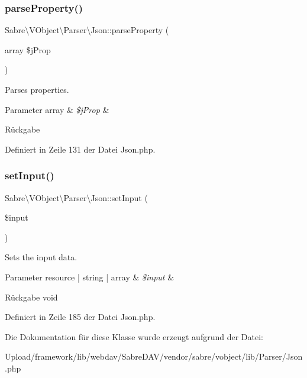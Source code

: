 \subsubsection{\texorpdfstring{parse\+Property()}{parseProperty()}}
{\footnotesize\ttfamily Sabre\textbackslash{}\+V\+Object\textbackslash{}\+Parser\textbackslash{}\+Json\+::parse\+Property (\begin{DoxyParamCaption}\item[{array}]{\$j\+Prop }\end{DoxyParamCaption})}

Parses properties.


\begin{DoxyParams}[1]{Parameter}
array & {\em \$j\+Prop} & \\
\hline
\end{DoxyParams}
\begin{DoxyReturn}{Rückgabe}

\end{DoxyReturn}


Definiert in Zeile 131 der Datei Json.\+php.

\mbox{\label{class_sabre_1_1_v_object_1_1_parser_1_1_json_a03348ab9610fe5ac4f820c87430f71a5}} 
\subsubsection{\texorpdfstring{set\+Input()}{setInput()}}
{\footnotesize\ttfamily Sabre\textbackslash{}\+V\+Object\textbackslash{}\+Parser\textbackslash{}\+Json\+::set\+Input (\begin{DoxyParamCaption}\item[{}]{\$input }\end{DoxyParamCaption})}

Sets the input data.


\begin{DoxyParams}[1]{Parameter}
resource | string | array & {\em \$input} & \\
\hline
\end{DoxyParams}
\begin{DoxyReturn}{Rückgabe}
void 
\end{DoxyReturn}


Definiert in Zeile 185 der Datei Json.\+php.



Die Dokumentation für diese Klasse wurde erzeugt aufgrund der Datei\+:\begin{DoxyCompactItemize}
\item 
Upload/framework/lib/webdav/\+Sabre\+D\+A\+V/vendor/sabre/vobject/lib/\+Parser/Json.\+php\end{DoxyCompactItemize}
